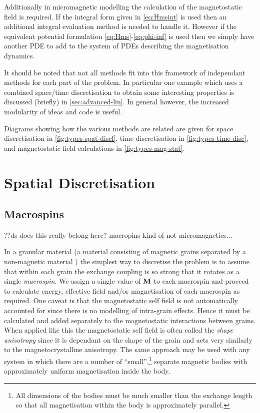 Additionally in micromagnetic modelling the calculation of the magnetostatic field is required.
If the integral form given in \eqref{eq:Hmsint} is used then an additional integral evaluation method is needed to handle it.
However if the equivalent potential formulation \eqref{eq:Hms}-\eqref{eq:phi-inf} is used then we simply have another PDE to add to the system of PDEs describing the magnetisation dynamics.

It should be noted that not all methods fit into this framework of independant methods for each part of the problem.
In particular one example which uses a combined space/time discretisation to obtain some interesting properties is discussed (briefly) in \autoref{sec:advanced-lin}.
In general however, the increased modularity of ideas and code is useful.

Diagrams showing how the various methods are related are given for space discretisation in \autoref{fig:types-spat-discl}, time discretisation in \autoref{fig:types-time-disc}, and magnetostatic field calculations in \autoref{fig:types-mag-stat}.

\section{Spatial Discretisation}
\label{sec:spat-discr}

\subsection{Macrospins}
\label{sec:sd-macrospins}

??ds does this really belong here? macropins kind of not micromagnetics...

In a granular material (a material consisting of magnetic grains separated by a non-magnetic material%
) the simplest way to discretise the problem is to assume that within each grain the exchange coupling is so strong that it rotates as a single \emph{macrospin}. We assign a single value of $\mathbf{M}$ to each macrospin and proceed to calculate energy, effective field and/or magnetisation of each macrospin as required. One caveat is that the magnetostatic self field is not automatically accounted for since there is no modelling of intra-grain effects. Hence it must be calculated and added separately to the magnetostatic interactions between grains. When applied like this the magnetostatic self field is often called the \emph{shape anisotropy} since it is dependant on the shape of the grain and acts very similarly to the magnetocrystalline anisotropy. The same approach may be used with any system in which there are a number of ``small'',\footnote{All dimensions of the bodies must be much smaller than the exchange length so that all magnetisation within the body is approximately parallel.} separate magnetic bodies with approximately uniform magnetisation inside the body.

